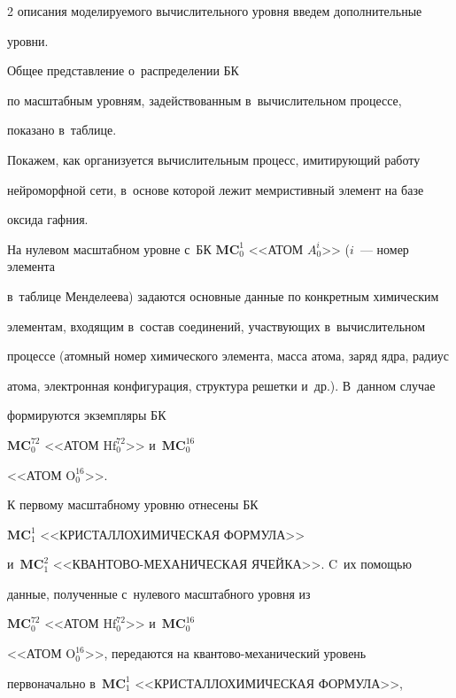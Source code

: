 \begin{multicols}{2}
описания моделируемого вы\-чис\-ли\-тель\-но\-го уровня введем дополнительные 


уровни.





    Общее представление о~распределении БК 


по масштабным уровням, задействованным в~вы\-чис\-ли\-тель\-ном процессе, 


показано в~таблице. 





   Покажем, как организуется вычислительным процесс, имитирующий работу 


нейроморфной сети, в~основе которой лежит мемристивный элемент на базе 


оксида гафния.


   


    На нулевом масштабном уровне с~БК $\mathbf{MC}_0^1$ <<АТОМ $A_0^i$>> ($i$~--- номер элемента 


в~таблице Менделеева) задаются основные данные по конкретным химическим 


элементам, входящим в~состав соединений, участвующих в~вычислительном 


процессе (атомный номер химического элемента, масса атома, заряд ядра, радиус 


атома, электронная конфигурация, структура решетки и~др.). В~данном случае 


формируются экземпляры БК 


$\mathbf{MC}_0^{72}$ <<АТОМ $\mathrm{Hf}_0^{72}$>> и~$\mathbf{MC}_0^{16}$ 


<<АТОМ $\mathrm{O}_0^{16}$>>.





    К первому масштабному уровню отнесены БК


$\mathbf{MC}_1^1$ <<КРИСТАЛЛОХИМИЧЕСКАЯ ФОРМУЛА>> 


и~$\mathbf{MC}_1^2$ <<КВАН\-ТО\-ВО-МЕ\-ХА\-НИ\-ЧЕ\-СКАЯ ЯЧЕЙКА>>. C~их по\-мощью 


данные, полученные с~нулевого масштабного уровня из 


$\mathbf{MC}_0^{72}$ <<АТОМ $\mathrm{Hf}_0^{72}$>> и~$\mathbf{MC}_0^{16}$ 


<<АТОМ $\mathrm{O}_0^{16}$>>, передаются на кван\-то\-во-ме\-ха\-ни\-че\-ский уровень 


первоначально в~$\mathbf{MC}_1^1$ <<КРИСТАЛЛОХИМИЧЕСКАЯ ФОРМУЛА>>, 



\end{multicols}
